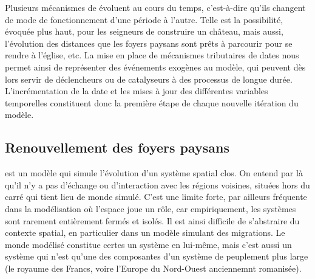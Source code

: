 \begin{tcolorbox}[breakable,left=0pt,right=0pt,top=0pt,bottom=0pt,
	colback=gray!15,colframe=gray!15,width=\dimexpr\textwidth\relax, 
	enlarge left by=0mm, boxsep=5pt,arc=0pt,outer arc=0pt]
Plusieurs mécanismes de \simfeodal{} évoluent au cours du temps, c'est-à-dire qu'ils changent de mode de fonctionnement d'une période à l'autre.
Telle est la possibilité, évoquée plus haut, pour les seigneurs de construire un château, mais aussi, l'évolution des distances que les foyers paysans sont prêts à parcourir pour se rendre à l'église, etc.
La mise en place de mécanismes tributaires de dates nous permet ainsi de représenter des événements exogènes au modèle, qui peuvent dès lors servir de déclencheurs ou de catalyseurs à des processus de longue durée.
L'incrémentation de la date et les mises à jour des différentes variables temporelles constituent donc la première étape de chaque nouvelle itération du modèle.
\end{tcolorbox}

\subsection{Renouvellement des foyers paysans \label{meca-renouvellement}}

\simfeodal{} est un modèle qui simule l'évolution d'un système spatial clos.
On entend par là qu'il n'y a pas d'échange ou d'interaction avec les régions voisines, situées hors du carré qui tient lieu de monde simulé.
C'est une limite forte, par ailleurs fréquente dans la modélisation où l'espace joue un rôle, car empiriquement, les systèmes sont rarement entièrement fermés et isolés.
Il est ainsi difficile de s'abstraire du contexte spatial, en particulier dans un modèle simulant des migrations.
Le monde modélisé constitue certes un système en lui-même, mais c'est aussi un système qui n'est qu'une des composantes d'un système de peuplement plus large (le royaume des Francs, voire l'Europe du Nord-Ouest anciennemnt romanisée).

